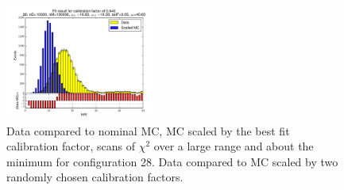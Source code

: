 \begin{figure}[htbp]
\begin{center}
\includegraphics[width=0.45\textwidth]{../FIGURES/28/FIG_Fit_result_for_calibration_factor_of_0_640.pdf} 
\caption{Data compared to nominal MC, MC scaled by the best fit calibration factor, scans of $\chi^2$ over a large range and about the minimum for configuration 28. Data compared to MC scaled by two randomly chosen calibration factors.} 
\label{tab:best_28} 
\end{center} \end{figure} 

